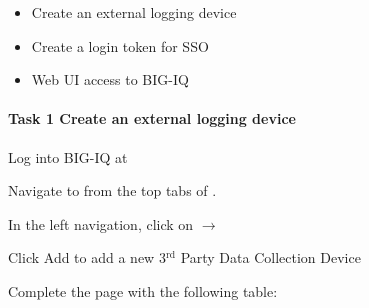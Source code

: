\documentclass[letterpaper,10pt,english]{sphinxmanual}
\begin{document}
\begin{itemize}
\item {} 
Create an external logging device

\item {} 
Create a login token for SSO

\end{itemize}

\begin{itemize}
\item {} 
Web UI access to BIG-IQ

\end{itemize}


\paragraph{Task 1 \textendash{} Create an external logging device}
\label{\detokenize{class1/module6/lab1:task-1-create-an-external-logging-device}}
Log into BIG-IQ at 

Navigate to  from the top tabs of .

In the left navigation, click on  \(\rightarrow\)


Click Add to add a new 3$^{\text{rd}}$ Party Data Collection Device


Complete the page with the following table:
\end{document}
